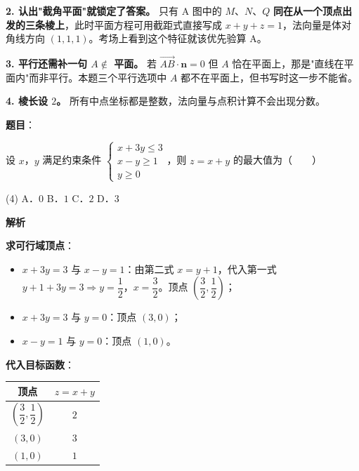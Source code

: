 \begin{answer}
\begin{gktip}
\textbf{2. 认出"截角平面"就锁定了答案。} 只有 A 图中的 $M$、$N$、$Q$ \textbf{同在从一个顶点出发的三条棱上}，此时平面方程可用截距式直接写成 $x+y+z=1$，法向量是体对角线方向 $(1,1,1)$。考场上看到这个特征就该优先验算 A。

\textbf{3. 平行还需补一句 $A\notin$ 平面。} 若 $\overrightarrow{AB}\cdot\boldsymbol n=0$ 但 $A$ 恰在平面上，那是"直线在平面内"而非平行。本题三个平行选项中 $A$ 都不在平面上，但书写时这一步不能省。

\textbf{4. 棱长设 $2$。} 所有中点坐标都是整数，法向量与点积计算不会出现分数。
\end{gktip}


\par\medskip

\end{answer}
\begin{answer}

\textbf{题目}：

设 $x$，$y$ 满足约束条件 $\begin{cases}x+3y\le3\\ x-y\ge1\\ y\ge0\end{cases}$，则 $z=x+y$ 的最大值为\mbox{（　　）}

\begin{gkopts}(4)
\task A．$0$
\task B．$1$
\task C．$2$
\task D．$3$
\end{gkopts}

\textbf{解析}

\textbf{求可行域顶点}：

\begin{itemize}
\item $x+3y=3$ 与 $x-y=1$：由第二式 $x=y+1$，代入第一式 $y+1+3y=3\Rightarrow y=\dfrac12$，$x=\dfrac32$。顶点 $\left(\dfrac32,\dfrac12\right)$；
\item $x+3y=3$ 与 $y=0$：顶点 $(3,0)$；
\item $x-y=1$ 与 $y=0$：顶点 $(1,0)$。
\end{itemize}

\textbf{代入目标函数}：

\begin{center}
\begin{tabular}{cc}
\toprule
顶点 & $z=x+y$ \\
\midrule
$\left(\dfrac32,\dfrac12\right)$ & $2$ \\
$(3,0)$ & $\boxed{3}$ \\
$(1,0)$ & $1$ \\
\bottomrule
\end{tabular}
\end{center}


\par\medskip

\end{answer}

